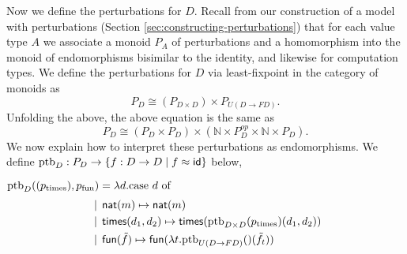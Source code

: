 Now we define the perturbations for $D$.
Recall from our construction of a model with perturbations
(Section \ref{sec:constructing-perturbations}) that for each value
type $A$ we associate a monoid $P_A$ of perturbations
and a homomorphism into the monoid of endomorphisms bisimilar to the identity,
and likewise for computation types.
We define the perturbations for $D$ via least-fixpoint in the category of monoids as
%
\[ P_D \cong (P_{D \times D}) \times P_{U(D \to FD)}. \]
%
Unfolding the above, the above equation is the same as
%
\[ P_D \cong (P_D \times P_D) \times (\mathbb{N} \times P_D^{op} \times \mathbb{N} \times P_D). \]
%
We now explain how to interpret these perturbations as endomorphisms.
We define $\text{ptb}_D : P_D \to \{ f : D \to D \mid f \approx \mathsf{id} \}$ below,

%
%

$\text{ptb}_D((p_{\text{times}}), p_{\text{fun}}) = \lambda d.\text{case $d$ of}$
\begin{align*}
    &\mathrel{\bf \,\mid\,} \mathsf{nat}(m) \mapsto \mathsf{nat}(m) \\
    &\mathrel{\bf \,\mid\,} \mathsf{times}(d_1, d_2) \mapsto {\mathsf{times}(\text{ptb}_{D \times D}(p_\text{times})(d_1, d_2))} \\
    &\mathrel{\bf \,\mid\,} \mathsf{fun}(\tilde{f}) \mapsto {\mathsf{fun}(\lambda t. \text{ptb}_{U(D \to FD)}()(\tilde{f}_t))} \\
\end{align*}


